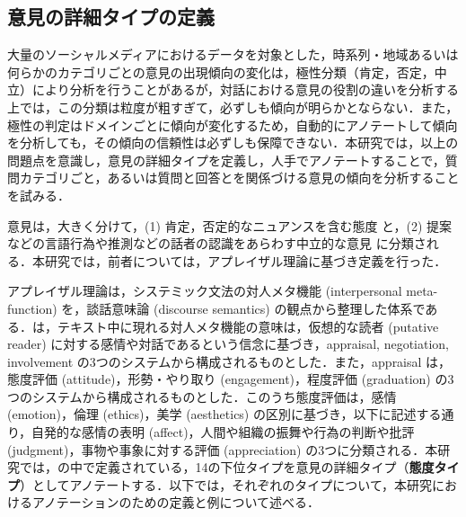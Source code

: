 \documentclass[japanese]{jnlp_1.4}
\begin{document}
\subsection{意見の詳細タイプの定義}
\label{subsec:opiniontype}

大量のソーシャルメディアにおけるデータを対象とした，時系列・地域あるいは何らかのカテゴリごとの意見の出現傾向の変化は，極性分類（肯定，否定，中立）により分析を行うことがあるが，対話における意見の役割の違いを分析する上では，この分類は粒度が粗すぎて，必ずしも傾向が明らかとならない．また，極性の判定はドメインごとに傾向が変化するため，自動的にアノテートして傾向を分析\cite{kucu2012wsdm}しても，その傾向の信頼性は必ずしも保障できない．本研究では，以上の問題点を意識し，意見の詳細タイプを定義し，人手でアノテートすることで，質問カテゴリごと，あるいは質問と回答とを関係づける意見の傾向を分析することを試みる．

意見は，大きく分けて，(1) 肯定，否定的なニュアンスを含む態度 と，(2) 提案などの言語行為や推測などの話者の認識をあらわす中立的な意見 に分類される．本研究では，前者については，アプレイザル理論\cite{martin2005}に基づき定義を行った．

アプレイザル理論は，システミック文法の対人メタ機能 (interpersonal meta-function) を，談話意味論 (discourse semantics) の観点から整理した体系である．は，テキスト中に現れる対人メタ機能の意味は，仮想的な読者 (putative reader) に対する感情や対話であるという信念に基づき，appraisal, negotiation, involvement の3つのシステムから構成されるものとした．また，appraisal は，態度評価 (attitude)，形勢・やり取り (engagement)，程度評価 (graduation) の3つのシステムから構成されるものとした．このうち態度評価は，感情 (emotion)，倫理 (ethics)，美学 (aesthetics) の区別に基づき，以下に記述する通り，自発的な感情の表明 (affect)，人間や組織の振舞や行為の判断や批評 (judgment)，事物や事象に対する評価 (appreciation) の3つに分類される．本研究では，の中で定義されている，14の下位タイプを意見の詳細タイプ（{\bf 態度タイプ}）としてアノテートする．以下では，それぞれのタイプについて，本研究におけるアノテーションのための定義と例について述べる．
\end{document}
